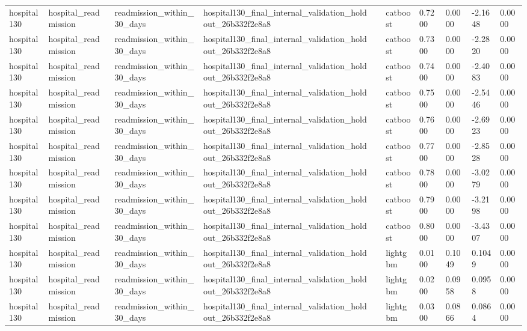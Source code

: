 \begin{tabular}{llllllllll}
hospital130 & hospital\_readmission & readmission\_within\_30\_days & hospital130\_final\_internal\_validation\_holdout\_26b332f2e8a8 &  & catboost & 0.7200 & 0.0000 & -2.1648 & 0.0000 \\
hospital130 & hospital\_readmission & readmission\_within\_30\_days & hospital130\_final\_internal\_validation\_holdout\_26b332f2e8a8 &  & catboost & 0.7300 & 0.0000 & -2.2820 & 0.0000 \\
hospital130 & hospital\_readmission & readmission\_within\_30\_days & hospital130\_final\_internal\_validation\_holdout\_26b332f2e8a8 &  & catboost & 0.7400 & 0.0000 & -2.4083 & 0.0000 \\
hospital130 & hospital\_readmission & readmission\_within\_30\_days & hospital130\_final\_internal\_validation\_holdout\_26b332f2e8a8 &  & catboost & 0.7500 & 0.0000 & -2.5446 & 0.0000 \\
hospital130 & hospital\_readmission & readmission\_within\_30\_days & hospital130\_final\_internal\_validation\_holdout\_26b332f2e8a8 &  & catboost & 0.7600 & 0.0000 & -2.6923 & 0.0000 \\
hospital130 & hospital\_readmission & readmission\_within\_30\_days & hospital130\_final\_internal\_validation\_holdout\_26b332f2e8a8 &  & catboost & 0.7700 & 0.0000 & -2.8528 & 0.0000 \\
hospital130 & hospital\_readmission & readmission\_within\_30\_days & hospital130\_final\_internal\_validation\_holdout\_26b332f2e8a8 &  & catboost & 0.7800 & 0.0000 & -3.0279 & 0.0000 \\
hospital130 & hospital\_readmission & readmission\_within\_30\_days & hospital130\_final\_internal\_validation\_holdout\_26b332f2e8a8 &  & catboost & 0.7900 & 0.0000 & -3.2198 & 0.0000 \\
hospital130 & hospital\_readmission & readmission\_within\_30\_days & hospital130\_final\_internal\_validation\_holdout\_26b332f2e8a8 &  & catboost & 0.8000 & 0.0000 & -3.4307 & 0.0000 \\
hospital130 & hospital\_readmission & readmission\_within\_30\_days & hospital130\_final\_internal\_validation\_holdout\_26b332f2e8a8 &  & lightgbm & 0.0100 & 0.1049 & 0.1049 & 0.0000 \\
hospital130 & hospital\_readmission & readmission\_within\_30\_days & hospital130\_final\_internal\_validation\_holdout\_26b332f2e8a8 &  & lightgbm & 0.0200 & 0.0958 & 0.0958 & 0.0000 \\
hospital130 & hospital\_readmission & readmission\_within\_30\_days & hospital130\_final\_internal\_validation\_holdout\_26b332f2e8a8 &  & lightgbm & 0.0300 & 0.0866 & 0.0864 & 0.0000 \\

\end{tabular}
